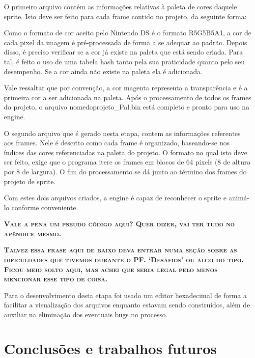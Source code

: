 \documentclass[brazil]{abnt}
\begin{document}
O primeiro arquivo contém as informações relativas à paleta de cores daquele sprite. Isto deve ser feito para cada frame contido no projeto, da seguinte forma:

Como o formato de cor aceito pelo Nintendo DS é o formato R5G5B5A1\footnotemark, a cor de cada pixel da imagem é pré-processada de forma a se adequar ao padrão. Depois disso, é preciso verificar se a cor já existe na paleta que está sendo criada. Para tal, é feito o uso de uma tabela hash tanto pela sua praticidade quanto pelo seu desempenho. Se a cor ainda não existe na paleta ela é adicionada. 

Vale ressaltar que por convenção, a cor magenta representa a transparência e é a primeira cor a ser adicionada na paleta. Após o processamento de todos os frames do projeto, o arquivo nomedoprojeto\_Pal.bin está completo e pronto para uso na engine.

O segundo arquivo que é gerado nesta etapa, contem as informações referentes aos frames. Nele é descrito como cada frame é organizado, baseando-se nos índices das cores referenciadas na paleta do projeto. O formato no qual isto deve ser feito, exige que o programa itere os frames em blocos de 64 pixels (8 de altura por 8 de largura). O fim do processamento se dá junto ao término dos frames do projeto de sprite. 

Com estes dois arquivos criados, a engine é capaz de reconhecer o sprite e animá-lo conforme conveniente. 

\textsc{\textbf{Vale a pena um pseudo código aqui? Quer dizer, vai ter tudo no apêndice mesmo.}}

\textsc{\textbf{Talvez essa frase aqui de baixo deva entrar numa seção sobre as dificuldades que tivemos durante o PF. ‘Desafios’ ou algo do tipo. Ficou meio solto aqui, mas achei que seria legal pelo menos mencionar esse tipo de coisa.}}

Para o desenvolvimento desta etapa foi usado um editor hexadecimal de forma a facilitar a visualização dos arquivos enquanto estavam sendo construídos, além de auxiliar na eliminação dos eventuais bugs no processo. 

\chapter{Conclusões e trabalhos futuros\label{cap:conclusao}}
\end{document}
